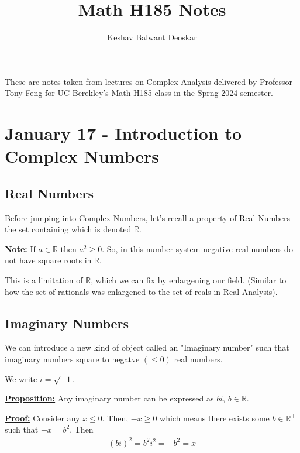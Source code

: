 \documentclass{article}
\title{Math H185 Notes}
\author{Keshav Balwant Deoskar}
\newcommand{\R}{\mathbb{R}}
\begin{document}
\maketitle

These are notes taken from lectures on Complex Analysis delivered by Professor Tony Feng for UC Berekley's Math H185 class in the Sprng 2024 semester.

\tableofcontents

\pagebreak

\section{January 17 - Introduction to Complex Numbers}

\vskip 0.5cm

\subsection{Real Numbers}
Before jumping into Complex Numbers, let's recall a property of Real Numbers - the set containing which is denoted $\mathbb{R}$.
\vskip 0.5cm

\underline{\textbf{Note:}} If $a \in \mathbb{R}$ then $a^2 \geq 0$.  
So, in this number system  negative real numbers do not have square roots in $\mathbb{R}$. 
\vskip 0.5cm

This is a limitation of $\mathbb{R}$, which we can fix by enlargening our field. (Similar to how the set of rationals was enlargened to the set of reals in Real Analysis).
\vskip 0.5cm


\subsection{Imaginary Numbers}
We can introduce a new kind of object called an "Imaginary number" such that imaginary numbers square to negatve $(\leq 0)$ real numbers.
\vskip 0.5cm

We write $i = \sqrt{-1}$.
\vskip 0.5cm

\underline{\textbf{Proposition:}} Any imaginary number can be expressed as $bi$, $b \in \mathbb{R}$.
\vskip 0.5cm

\underline{\textbf{Proof:}} Consider any $x \leq 0$. Then, $-x \geq 0$ which means there exists some $b \in \R^+$ such that $-x = b^2$. Then
\begin{align*}
  \left(bi\right)^2 = b^2 i ^2 = -b^2 = x
\end{align*}
\end{document}

